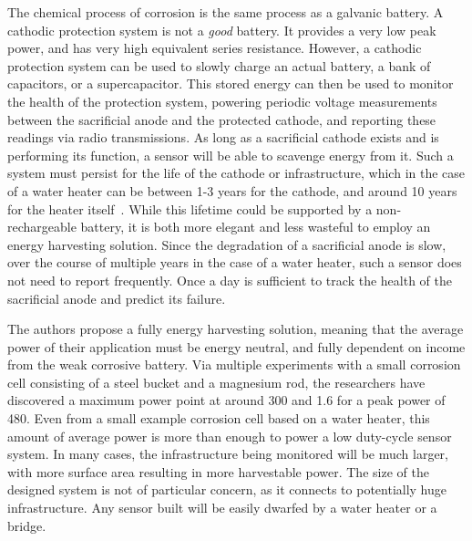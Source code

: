 The chemical process of corrosion is the same process as a galvanic battery.
A cathodic protection system is not a \textit{good} battery.
It provides a very low peak power, and has very high equivalent series resistance.
However, a cathodic protection system can be used to slowly charge an actual battery, a bank of capacitors, or a supercapacitor.
This stored energy can then be used to monitor the health of the protection system, powering periodic voltage measurements between the sacrificial anode and the protected cathode, and reporting these readings via radio transmissions.
As long as a sacrificial cathode exists and is performing its function, a sensor will be able to scavenge energy from it.
Such a system must persist for the life of the cathode or infrastructure, which in the case of a water heater can be between 1-3 years for the cathode, and around 10 years for the heater itself~\cite{jagtap2021repurposing}.
While this lifetime could be supported by a non-rechargeable battery, it is both more elegant and less wasteful to employ an energy harvesting solution.
Since the degradation of a sacrificial anode is slow, over the course of multiple years in the case of a water heater, such a sensor does not need to report frequently.
Once a day is sufficient to track the health of the sacrificial anode and predict its failure.

The authors propose a fully energy harvesting solution, meaning that the average power of their application must be energy neutral, and fully dependent on income from the weak corrosive battery.
Via multiple experiments with a small corrosion cell consisting of a steel bucket and a magnesium rod, the researchers have discovered a maximum power point at around 300\ssi{\milli\volt} and 1.6\ssi{\milli\ampere} for a peak power of 480\ssi{\micro\watt}.
Even from a small example corrosion cell based on a water heater, this amount of average power is more than enough to power a low duty-cycle sensor system.
In many cases, the infrastructure being monitored will be much larger, with more surface area resulting in more harvestable power.
The size of the designed system is not of particular concern, as it connects to potentially huge infrastructure.
Any sensor built will be easily dwarfed by a water heater or a bridge.

